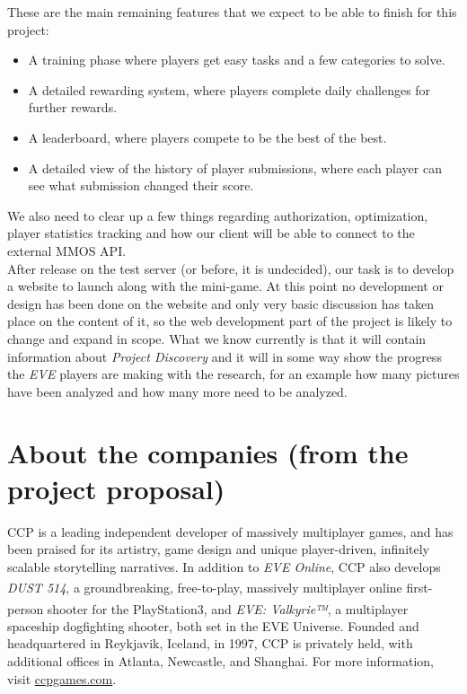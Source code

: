 \documentclass[11pt]{article}
\begin{document}
These are the main remaining features that we expect to be able to finish for this project:
\begin{itemize}
  \item A training phase where players get easy tasks and a few categories to solve.
  \item A detailed rewarding system, where players complete daily challenges for further rewards.
  \item A leaderboard, where players compete to be the best of the best.
  \item A detailed view of the history of player submissions, where each player can see what submission changed their score.
\end{itemize}

We also need to clear up a few things regarding authorization, optimization, player statistics tracking and how our client will be able to connect to the external MMOS API.\\

After release on the test server (or before, it is undecided), our task is to develop a website to launch along with the mini-game. At this point no development or design has been done on the website and only very basic discussion has taken place on the content of it, so the web development part of the project is likely to change and expand in scope. What we know currently is that it will contain information about \emph{Project Discovery} and it will in some way show the progress the \emph{EVE} players are making with the research, for an example how many pictures have been analyzed and how many more need to be analyzed.

\section*{About the companies (from the project proposal)}
CCP is a leading independent developer of massively multiplayer games, and has
been praised for its artistry, game design and unique player-driven, infinitely scalable
storytelling narratives. In addition to \emph{EVE Online}, CCP also develops \emph{DUST 514\textsuperscript{\textregistered}}, a
groundbreaking, free-to-play, massively multiplayer online first-person shooter for
the PlayStation\textsuperscript{\textregistered}3, and \emph{EVE: Valkyrie™}, a multiplayer spaceship dogfighting shooter, both set in the EVE Universe. Founded and headquartered in Reykjavik,
Iceland, in 1997, CCP is privately held, with additional offices in Atlanta, Newcastle,
and Shanghai. For more information, visit \href{http://www.ccpgames.com/}{ccpgames.com}.\\
\end{document}
